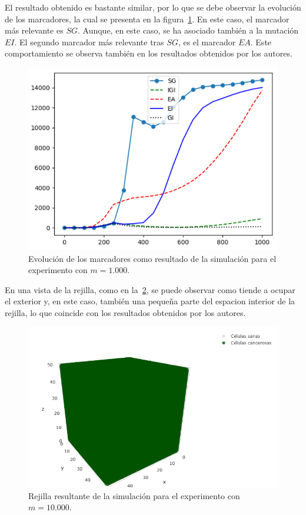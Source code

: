 El resultado obtenido es bastante similar, por lo que se debe observar la evolución de los
marcadores, la cual se presenta en la figura~\ref{fig:ownexp2-2}. En este caso, el marcador
más relevante es $SG$. Aunque, en este caso, se ha asociado también a la mutación $EI$. El segundo marcador
más relevante tras $SG$, es el marcador $EA$. Este comportamiento se observa también en
los resultados obtenidos por los autores.

\begin{figure}[h]
\centering
\includegraphics[scale=0.8]{figures/experiments/exp2/mutations}
\caption{Evolución de los marcadores como resultado de la simulación para el experimento con $m = 1.000$.}
\label{fig:ownexp2-2}
\end{figure}

En una vista de la rejilla, como en la~\ref{fig:ownexp2-3}, se puede observar como
tiende a ocupar el exterior y, en este caso, también una pequeña parte del espacion
interior de la rejilla, lo que coincide con los resultados obtenidos por los
autores.

\begin{figure}[h]
\centering
\includegraphics[scale=0.6]{figures/experiments/exp2/grid}
\caption{Rejilla resultante de la simulación para el experimento con $m = 10.000$.}
\label{fig:ownexp2-3}
\end{figure}

